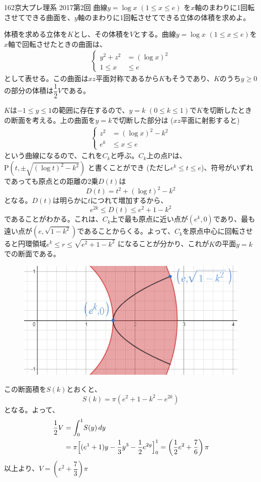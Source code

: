 \begin{thm}{162}{}{京大プレ理系 2017第2回}
 曲線$y=\log x$ $(1\le x \le e)$ を$x$軸のまわりに1回転させてできる曲面を、$y$軸のまわりに1回転させてできる立体の体積を求めよ。
\end{thm}

体積を求める立体を$K$とし、その体積を$V$とする。曲線$y=\log x$ $(1\le x\le e)$を$x$軸で回転させたときの曲面は、
\begin{align*}
 \left\{
 \begin{aligned}
  y^2+z^2&=(\log x)^2 \\
  1\le x&\le e
 \end{aligned}
 \right.
\end{align*}
として表せる。この曲面は$xz$平面対称であるから$K$もそうであり、$K$のうち$y\ge 0$の部分の体積は$\dfrac{1}{2}V$である。

$K$は$-1\le y\le 1$の範囲に存在するので、$y=k$ $(0\le k\le 1)$で$K$を切断したときの断面を考える。上の曲面を$y=k$で切断した部分は ($xz$平面に射影すると)
\begin{align*}
 \left\{
 \begin{aligned}
  z^2&=(\log x)^2-k^2 \\
  e^k&\le x\le e
 \end{aligned}
 \right.
\end{align*}
という曲線になるので、これを$C_k$と呼ぶ。$C_k$上の点$\mathrm{P}$は、$\mathrm{P}(t,\pm\sqrt{(\log t)^2-k^2})$ と書くことができ (ただし$e^k\le t\le e$)、符号がいずれであっても原点との距離の2乗$D(t)$は
\[ D(t)=t^2+(\log t)^2-k^2 \]
となる。$D(t)$は明らかに$t$につれて増加するから、
\[ e^{2k}\le D(t)\le e^2+1-k^2 \]
であることがわかる。これは、$C_k$上で最も原点に近い点が$(e^{k},0)$であり、最も遠い点が$(e,\sqrt{1-k^2})$であることからくる。よって、$C_k$を原点中心に回転させると円環領域$e^k\le r\le \sqrt{e^2+1-k^2}$ になることが分かり、これが$K$の平面$y=k$での断面である。
\begin{figure}[H]
 \centering
 \includegraphics[width=0.8\linewidth]{../problems/Q_162/A_162.png}
\end{figure}
この断面積を$S(k)$とおくと、
\[ S(k)=\pi(e^2+1-k^2-e^{2k}) \]
となる。よって、
\begin{align*}
 \frac{1}{2}V&=\int_0^1\! S(y) \,dy \\
 &=\pi\Bigl[(e^1+1)y-\frac{1}{3}y^3-\frac{1}{2}e^{2y}\Bigr]_0^1 = \left(\frac{1}{2}e^2+\frac{7}{6}\right)\pi
\end{align*}
以上より、$V=\left(e^2+\dfrac{7}{3}\right)\pi$